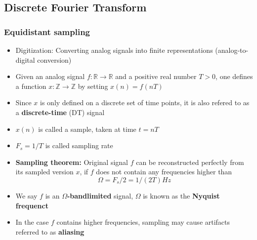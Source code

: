 \documentclass{scrartcl}
\begin{document}
\subsection{Discrete Fourier Transform}
\subsubsection*{Equidistant sampling}
\begin{itemize}
    \item
        Digitization: Converting analog signals into finite representations (analog-to-digital conversion) 
    \item
        Given an analog signal $f: \mathbb{R} \rightarrow \mathbb{R}$ and a positive real number $T > 0$, one defines a function $x: \mathbb{Z} \rightarrow \mathbb{Z}$ by setting $x(n) = f(nT)$
    \item
        Since $x$ is only defined on a discrete set of time points, it is also refered to as a \textbf{discrete-time} (DT) signal
    \item
        $x(n)$ is called a sample, taken at time $t = nT$
    \item
        $F_s = 1/T$ is called sampling rate
    \item
        \textbf{Sampling theorem:} Original signal $f$ can be reconstructed perfectly from its sampled version $x$, if $f$ does not contain any frequencies higher than
        $$ \Omega = F_s/2 = 1/(2T) Hz $$
    \item
        We say $f$ is an \textbf{$\Omega$-bandlimited} signal, $\Omega$ is known as the \textbf{Nyquist frequenct}
    \item
        In the case $f$ contains higher frequencies, sampling may cause artifacts referred to as \textbf{aliasing}
\end{itemize}
\end{document}

